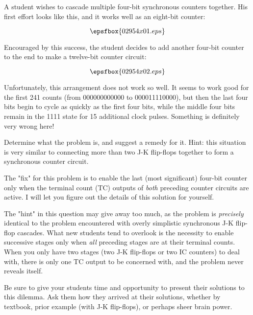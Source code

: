 

A student wishes to cascade multiple four-bit synchronous counters together.  His first effort looks like this, and it works well as an eight-bit counter:

$$\epsfbox{02954x01.eps}$$

Encouraged by this success, the student decides to add another four-bit counter to the end to make a twelve-bit counter circuit:

$$\epsfbox{02954x02.eps}$$

Unfortunately, this arrangement does not work so well.  It seems to work good for the first 241 counts (from 000000000000 to 000011110000), but then the last four bits begin to cycle as quickly as the first four bits, while the middle four bits remain in the 1111 state for 15 additional clock pulses.  Something is definitely very wrong here!

Determine what the problem is, and suggest a remedy for it.  Hint: this situation is very similar to connecting more than two J-K flip-flops together to form a synchronous counter circuit.







The "fix" for this problem is to enable the last (most significant) four-bit counter only when the terminal count (TC) outputs of {\it both} preceding counter circuits are active.  I will let you figure out the details of this solution for yourself.







The "hint" in this question may give away too much, as the problem is {\it precisely} identical to the problem encountered with overly simplistic synchronous J-K flip-flop cascades.  What new students tend to overlook is the necessity to enable successive stages only when {\it all} preceding stages are at their terminal counts.  When you only have two stages (two J-K flip-flops or two IC counters) to deal with, there is only one TC output to be concerned with, and the problem never reveals itself.

Be sure to give your students time and opportunity to present their solutions to this dilemma.  Ask them how they arrived at their solutions, whether by textbook, prior example (with J-K flip-flops), or perhaps sheer brain power.




